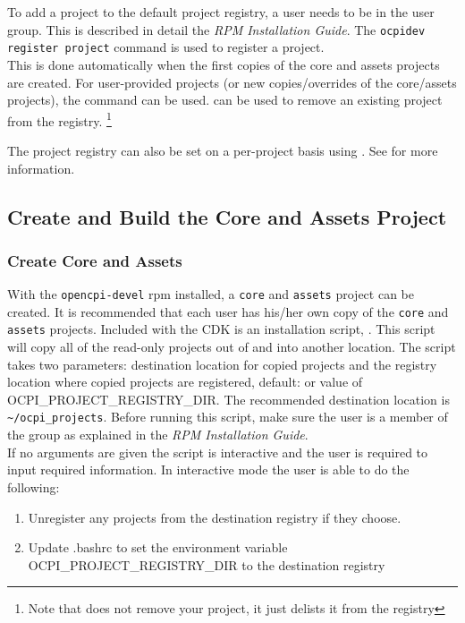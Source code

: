 To add a project to the default project registry, a user needs to be in the  user group.  This is described in detail the \textit{RPM Installation Guide}.  The \verb+ocpidev register project+ command is used to register a project.\\
This is done automatically when the first copies of the core and assets projects are created. For user-provided projects (or new copies/overrides of the core/assets projects), the  command can be used.  can be used to remove an existing project from the registry. \footnote{Note that  does not remove your project, it just delists it from the registry}\\


The project registry can also be set on a per-project basis using . See  for more information.

\subsection{Create and Build the Core and Assets Project}
\subsubsection{Create Core and Assets}
With the \texttt{opencpi-devel} rpm installed, a \texttt{core} and \texttt{assets} project can be created. It is recommended that each user has his/her own copy of the \texttt{core} and \texttt{assets} projects. Included with the CDK is an installation script,  . This script will copy all of the read-only projects out of  and into another location. The script takes two parameters: destination location for copied projects and the registry location where copied projects are registered, default:  or value of OCPI\_PROJECT\_REGISTRY\_DIR. The recommended destination location is \verb+~/ocpi_projects+. Before running this script, make sure the user is a member of the  group as explained in the \textit{RPM Installation Guide}.\\

If no arguments are given the script is interactive and the user is required to
input required information.  In interactive mode the user is able to do the
following:
\begin{enumerate}
\item Unregister any projects from the destination registry if they choose.
\item Update .bashrc to set the environment variable OCPI\_PROJECT\_REGISTRY\_DIR to the destination registry
\end{enumerate}

